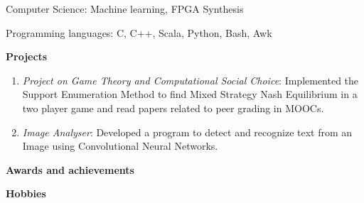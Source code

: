 \documentclass[a4paper, 11pt]{article}
\begin{document}
\noindent Computer Science\hspace{12.2mm}:\hspace{2mm} Machine learning, FPGA Synthesis

\noindent Programming languages\hspace{2mm}:\hspace{2mm} C, C++, Scala, Python, Bash, Awk

\vspace{4mm}

\noindent\textbf{Projects}
\begin{enumerate}
\item \textit {Project on Game Theory and Computational Social Choice}: Implemented the Support Enumeration Method to find Mixed Strategy Nash Equilibrium in a two player game and read papers related to peer grading in MOOCs.

\item \textit {Image Analyser}: Developed a program to detect and recognize text from an Image using Convolutional Neural Networks.
\end{enumerate}

\noindent\textbf{Awards and achievements}

\vspace{2.5mm}


\vspace{2mm}


\vspace{3mm}
 
\noindent\textbf{Hobbies}

\vspace{2mm}


\vspace{2mm}

 
\vspace{2mm}

\end{document}
